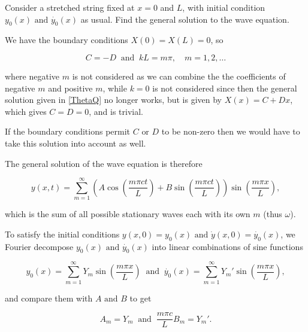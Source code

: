 \documentclass[a4paper,12pt]{report}
\begin{document}
{Consider a stretched string fixed at \(x=0\) and \(L\), with initial condition \(y_0 (x) \text { and }  \dot{y_0 }(x) \) as usual. Find the general solution to the wave equation. }
{We have the boundary conditions \(X(0) = X(L) = 0\), so

\begin{equation}
	C = - D ~\text { and }~ kL = m \pi , \quad m = 1,2,\ldots 
\end{equation}

where negative \(m\) is not considered as we can combine the the coefficients of negative \(m\) and positive \(m\), while \(k = 0\) is not considered since then the general solution given in \cref{ThetaQ} no longer works, but is given by \(X(x) = C + Dx\), which gives \(C = D = 0\), and is trivial.

If the boundary conditions permit \(C \text { or } D\) to be non-zero then we would have to take this solution into account as well. 

The general solution of the wave equation is therefore

\begin{equation}
	y(x,t) = \sum_{m=1}^{\infty}\left( A\cos \left( \frac{m \pi ct}{L}  \right) + B  \sin \left( \frac{m \pi ct}{L}  \right)  \right) \sin \left( \frac{m \pi x}{L}  \right),
\end{equation}

which is the sum of all possible stationary waves each with its own \(m\) (thus \(\omega \)).

To satisfy the initial conditions \(y(x,0) = y_0 (x) \text { and } \dot{y}(x,0) = \dot{y_0 }(x)  \), we Fourier decompose \(y_0 (x) \text { and } \dot{y_0 }(x) \) into linear combinations of sine functions 

\begin{equation}
	y_0 (x) = \sum_{m=1}^{\infty} Y_{m}\sin \left( \frac{m\pi x}{L}  \right) ~\text { and }~ \dot{y_0 }(x) = \sum_{m=1}^{\infty} Y_{m}' \sin \left( \frac{m \pi x}{L}  \right),   
\end{equation}

and compare them with \(A \text { and } B \) to get

\begin{equation}
	A_{m} = Y_{m} ~\text { and }~ \frac{m\pi c}{L} B_{m} = Y_{m}'.
\end{equation}}
\end{document}
